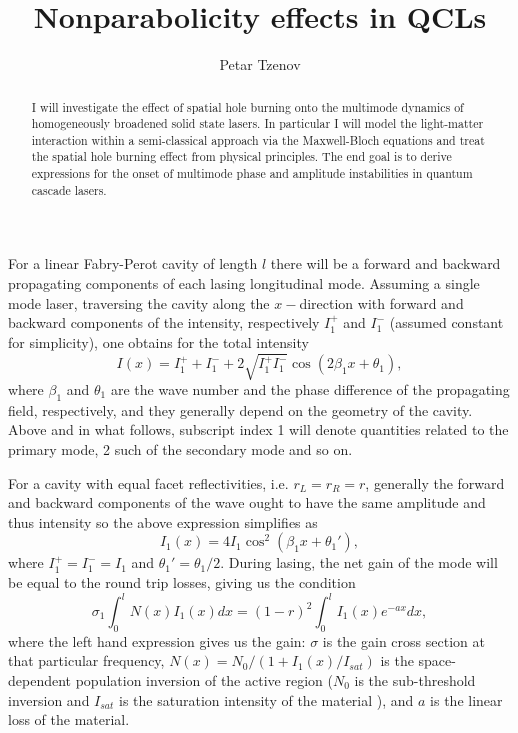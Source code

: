 \documentclass[preprint,secnumarabic,amssymb, nobibnotes, aip, prd]{revtex4-1}
\begin{document}
\title{Nonparabolicity effects in QCLs}%


\author{Petar Tzenov}%
\begin{abstract}
	I will investigate the effect of spatial hole burning onto the multimode dynamics of homogeneously broadened solid state lasers. In particular I will model the light-matter interaction within a semi-classical approach via the Maxwell-Bloch equations and treat the spatial hole burning effect from physical principles. The end goal is to derive expressions for the onset of multimode phase and amplitude instabilities in quantum cascade lasers. 
\end{abstract}
\maketitle
For a linear Fabry-Perot cavity of length $l$ there will be a forward and backward propagating components of each lasing longitudinal mode. Assuming a single mode laser, traversing the cavity along the $x-$direction with forward and backward components of the intensity, respectively $I_1^+$ and $I_1^-$ (assumed constant for simplicity), one obtains for the total intensity 
\begin{equation}
I(x) = I_1^+ + I_1^-+2\sqrt{I_1^+I_1^-}\cos(2\beta_1 x+\theta_1), 
\end{equation} 
where $\beta_1$ and $\theta_1$ are the wave number and the phase difference of the propagating field, respectively, and they generally depend on the geometry of the cavity. Above and in what follows, subscript index 1 will denote quantities related to the primary mode, 2 such of the secondary mode and so on. 

For a cavity with equal facet reflectivities, i.e. $r_L = r_R = r$, generally the forward and backward components of the wave ought to have the same amplitude and thus intensity so the above expression simplifies as 
\begin{equation}
\label{eq:interference}
I_1(x) =4I_1\cos^2(\beta_1 x+\theta_1'),
\end{equation} 
where $I_1^+=I_1^-=I_1$ and $\theta_1'= \theta_1/2$.
During lasing, the net gain of the mode will be equal to the round trip losses, giving us the condition 
\begin{equation}
\label{eq:balance}
\sigma_1\int_{0}^{l} N(x)I_1(x)dx = (1-r)^2\int_{0}^{l}I_1(x)e^{-ax}dx,
\end{equation} 
where the left hand expression gives us the gain: $\sigma$ is the gain cross section at that particular frequency, $N(x) = N_0/(1+I_1(x)/I_{sat})$ is the space-dependent population inversion of the active region ($N_0$ is the sub-threshold inversion and $I_{sat}$ is the saturation intensity of the material \cite{siegman1986lasers}),  and $a$ is the linear loss of the material. 
\end{document}
